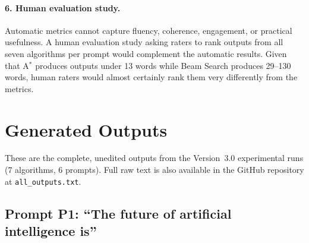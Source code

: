 \documentclass[12pt]{article}
\begin{document}
	\paragraph{6. Human evaluation study.}
	Automatic metrics cannot capture fluency, coherence, engagement, or practical usefulness. A human evaluation study asking raters to rank outputs from all seven algorithms per prompt would complement the automatic results. Given that A$^*$ produces outputs under 13 words while Beam Search produces 29--130 words, human raters would almost certainly rank them very differently from the metrics.
	
	\newpage
	\appendix
	
	\section{Generated Outputs}
	\label{app:outputs}
	
	 These are the complete, unedited outputs from the Version~3.0 experimental runs (7 algorithms, 6 prompts). Full raw text is also available in the GitHub repository at \texttt{all\_outputs.txt}.
	
\setlength{\fboxsep}{6pt}

\subsection*{Prompt P1: ``The future of artificial intelligence is''}

\noindent{}

\vspace{3pt}
\noindent{}
\end{document}
